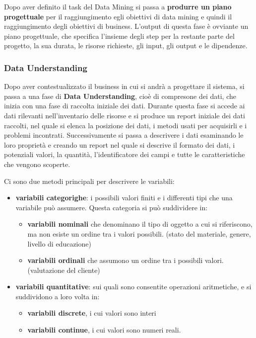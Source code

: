 \documentclass[a4paper]{extarticle}
\begin{document}
Dopo aver definito il task del Data Mining si passa a \textbf{produrre un piano progettuale} per il raggiungimento egli obiettivi di data mining e quindi il raggiungimento degli obiettivi di business. L'output di questa fase è ovviante un piano progettuale, che specifica l'insieme degli step per la restante parte del progetto, la sua durata, le risorse richieste, gli input, gli output e le dipendenze.

\subsubsection{Data Understanding}

Dopo aver contestualizzato il business in cui si andrà a progettare il sistema, si passa a una fase di \textbf{Data Understanding}, cioè di compresone dei dati, che inizia con una fase di raccolta iniziale dei dati. Durante questa fase si accede ai dati rilevanti nell'inventario delle risorse e si produce un report iniziale dei dati raccolti, nel quale si elenca la posizione dei dati, i metodi usati per acquisirli e i problemi incontrati. Successivamente si passa a descrivere i dati esaminando le loro proprietà e creando un report nel quale si descrive il formato dei dati, i potenziali valori, la quantità, l'identificatore dei campi e tutte le caratteristiche che vengono scoperte.

Ci sono due metodi principali per descrivere le variabili:

\begin{itemize}
\item \textbf{variabili categorighe}: i possibili valori finiti e i differenti tipi che una variabile può assumere. Questa categoria si può suddividere in:
	\begin{itemize}
	\item \textbf{variabili nominali} che denominano il tipo di oggetto a cui si riferiscono, ma non esiste un 	ordine tra i valori possibili. (stato del materiale, genere, livello di educazione)
	\item \textbf{variabili ordinali} che assumono un ordine tra i possibili valori. (valutazione del cliente)
	\end{itemize}

\item \textbf{variabili quantitative}: sui quali sono consentite operazioni aritmetiche, e si suddividono a loro volta in:

\begin{itemize}
	\item \textbf{variabili discrete}, i cui valori sono interi
	\item \textbf{variabili continue}, i cui valori sono numeri reali.
	\end{itemize}

\end{itemize}
\end{document}
